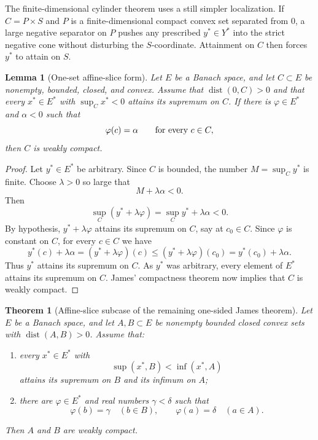 \documentclass[11pt]{article}
\newtheorem{theorem}{Theorem}
\newtheorem{lemma}{Lemma}
\newcommand{\dist}{\operatorname{dist}}
\begin{document}
The finite-dimensional cylinder theorem uses a still simpler
localization. If \(C=P\times S\) and \(P\) is a finite-dimensional
compact convex set separated from \(0\), a large negative separator on
\(P\) pushes any prescribed \(y^\ast\in Y^\ast\) into the strict negative
cone without disturbing the \(S\)-coordinate. Attainment on \(C\) then
forces \(y^\ast\) to attain on \(S\).

\begin{lemma}[One-set affine-slice form]
\label{lem:one-set}
Let \(E\) be a Banach space, and let \(C\subset E\) be nonempty, bounded,
closed, and convex. Assume that \(\dist(0,C)>0\) and that every
\(x^\ast\in E^\ast\) with \(\sup_C x^\ast<0\) attains its supremum on
\(C\). If there is \(\varphi\in E^\ast\) and \(\alpha<0\) such that
\[
  \varphi(c)=\alpha\qquad\hbox{for every }c\in C,
\]
then \(C\) is weakly compact.
\end{lemma}

\begin{proof}
Let \(y^\ast\in E^\ast\) be arbitrary. Since \(C\) is bounded, the number
\(M=\sup_C y^\ast\) is finite. Choose \(\lambda>0\) so large that
\[
  M+\lambda\alpha<0.
\]
Then
\[
  \sup_C (y^\ast+\lambda\varphi)
  =
  \sup_C y^\ast+\lambda\alpha
  <0.
\]
By hypothesis, \(y^\ast+\lambda\varphi\) attains its supremum on \(C\),
say at \(c_0\in C\). Since \(\varphi\) is constant on \(C\), for every
\(c\in C\) we have
\[
  y^\ast(c)+\lambda\alpha
  =
  (y^\ast+\lambda\varphi)(c)
  \le
  (y^\ast+\lambda\varphi)(c_0)
  =
  y^\ast(c_0)+\lambda\alpha.
\]
Thus \(y^\ast\) attains its supremum on \(C\). As \(y^\ast\) was
arbitrary, every element of \(E^\ast\) attains its supremum on \(C\).
James' compactness theorem now implies that \(C\) is weakly compact.
\end{proof}

\begin{theorem}[Affine-slice subcase of the remaining one-sided James theorem]
\label{thm:main}
Let \(E\) be a Banach space, and let \(A,B\subset E\) be nonempty
bounded closed convex sets with \(\dist(A,B)>0\). Assume that:
\begin{enumerate}
\item every \(x^\ast\in E^\ast\) with
\[
  \sup(x^\ast,B)<\inf(x^\ast,A)
\]
attains its supremum on \(B\) and its infimum on \(A\);
\item there are \(\varphi\in E^\ast\) and real numbers \(\gamma<\delta\)
such that
\[
  \varphi(b)=\gamma\quad(b\in B),\qquad
  \varphi(a)=\delta\quad(a\in A).
\]
\end{enumerate}
Then \(A\) and \(B\) are weakly compact.
\end{theorem}
\end{document}
